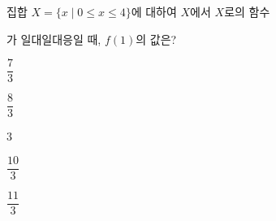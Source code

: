 \hspace*{2mm}\begin{minipage}[t]{\dimexpr\linewidth-2mm\relax}\vspace{0pt}
집합 $X=\{x \mid 0\le x\le 4\}$에 대하여 $X$에서 $X$로의 함수\par\smallskip{}\par\smallskip\noindent 가 일대일대응일 때, $f(1)$의 값은? 
\begin{choices32}{\rule[-3ex]{0pt}{8ex}$\dfrac{7}{3}$}{\rule[-3ex]{0pt}{8ex}$\dfrac{8}{3}$}{\rule[-3ex]{0pt}{8ex}$3$}{\rule[-3ex]{0pt}{8ex}$\dfrac{10}{3}$}{\rule[-3ex]{0pt}{8ex}$\dfrac{11}{3}$}\end{choices32}\end{minipage}
